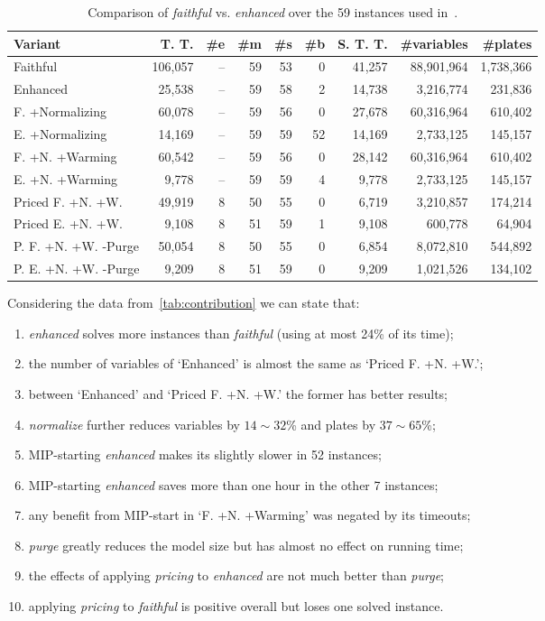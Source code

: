 \documentclass[smallextended]{svjour3}       %
\begin{document}
\begin{table}
\caption{Comparison of \emph{faithful} vs. \emph{enhanced} over the 59 instances used in~\cite{dimitri_thesis}.}
\begin{tabular}{lrrrrrrrr}
\hline\hline
Variant & T. T. & \#e & \#m & \#s & \#b & S. T. T. & \#variables & \#plates \\\hline
Faithful & 106,057 & -- & 59 & 53 & 0 & 41,257 & 88,901,964 & 1,738,366 \\
Enhanced & 25,538 & -- & 59 & 58 & 2 & 14,738 & 3,216,774 & 231,836 \\
F. +Normalizing & 60,078 & -- & 59 & 56 & 0 & 27,678 & 60,316,964 & 610,402 \\
E. +Normalizing & 14,169 & -- & 59 & 59 & 52 & 14,169 & 2,733,125 & 145,157 \\
F. +N. +Warming & 60,542 & -- & 59 & 56 & 0 & 28,142 & 60,316,964 & 610,402 \\
E. +N. +Warming & 9,778 & -- & 59 & 59 & 4 & 9,778 & 2,733,125 & 145,157 \\
Priced F. +N. +W. & 49,919 & 8 & 50 & 55 & 0 & 6,719 & 3,210,857 & 174,214 \\
Priced E. +N. +W. & 9,108 & 8 & 51 & 59 & 1 & 9,108 & 600,778 & 64,904 \\
P. F. +N. +W. -Purge & 50,054 & 8 & 50 & 55 & 0 & 6,854 & 8,072,810 & 544,892 \\
P. E. +N. +W. -Purge & 9,209 & 8 & 51 & 59 & 0 & 9,209 & 1,021,526 & 134,102 \\\hline\hline
\end{tabular}
\label{tab:contribution}
\end{table}

Considering the data from~\autoref{tab:contribution} we can state that:
\begin{enumerate}
\item \emph{enhanced} solves more instances than \emph{faithful} (using at most 24\% of its time);
\item the number of variables of `Enhanced' is almost the same as `Priced F. +N. +W.';
\item between `Enhanced' and `Priced F. +N. +W.' the former has better results;
\item \emph{normalize} further reduces variables by \(14\sim32\)\% and plates by \(37\sim65\)\%;
\item MIP-starting \emph{enhanced} makes its slightly slower in 52 instances;
\item MIP-starting \emph{enhanced} saves more than one hour in the other 7 instances;
\item any benefit from MIP-start in `F. +N. +Warming' was negated by its timeouts;
\item \emph{purge} greatly reduces the model size but has almost no effect on running time;
\item the effects of applying \emph{pricing} to \emph{enhanced} are not much better than \emph{purge};
\item applying \emph{pricing} to \emph{faithful} is positive overall but loses one solved instance.
\end{enumerate}
\end{document}
